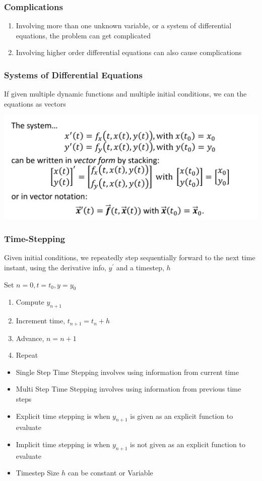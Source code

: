 \documentclass[twoside]{article}
\begin{document}
\subsubsection{Complications}
\begin{enumerate}
\item Involving more than one unknown variable, or a system of differential equations, the problem can get complicated
\item Involving higher order differential equations can also cause complications
\end{enumerate}

\subsubsection{Systems of Differential Equations}
If given multiple dynamic functions and multiple initial conditions, we can the equations as vectors
\begin{center}
\includegraphics[scale=0.3]{1}
\end{center}

\subsubsection{Time-Stepping}
Given initial conditions, we repeatedly step sequentially forward to the next time instant, using the derivative info, \(y^\prime\) and a timestep, \(h\)

Set \(n = 0, t=t_0, y = y_0\)
\begin{enumerate}
\item Compute \(y_{n+1}\)
\item Increment time, \(t_{n+1} = t_n + h\)
\item Advance, \(n = n + 1\)
\item Repeat
\end{enumerate}

\begin{itemize}
\item Single Step Time Stepping involves using information from current time 
\item Multi Step Time Stepping involves using information from previous time steps
\item Explicit time stepping is when \(y_{n+1}\) is given as an explicit function to evaluate
\item Implicit time stepping is when \(y_{n+1}\) is not given as an explicit function to evaluate
\item Timestep Size \(h\) can be constant or Variable
\end{itemize}
\end{document}
